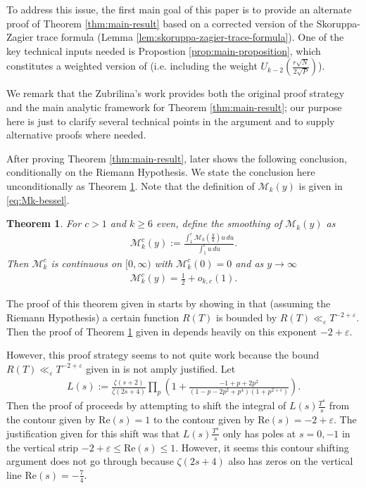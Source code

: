 \documentclass[12pt,letterpaper,reqno]{amsart}
\theoremstyle{plain}
\newtheorem{theorem}{Theorem}[section]
\theoremstyle{definition}
\numberwithin{equation}{section}
\numberwithin{figure}{section}
\numberwithin{table}{section}
\newcommand{\lrp}[1]{\!\left(#1\right)}
\newcommand{\M}{\mathcal{M}}
\begin{document}
To address this issue, the first main goal of this paper is to provide an alternate proof of Theorem \ref{thm:main-result} based on a corrected version of the Skoruppa-Zagier trace formula (Lemma \ref{lem:skoruppa-zagier-trace-formula}). One of the key technical inputs needed is Propostion \ref{prop:main-proposition}, which constitutes a weighted version of \cite[Proposition 3.2]{Zubrilina} (i.e. including the weight $U_{k-2}\lrp{\frac{r \sqrt N}{2 \sqrt P}}$). 

We remark that the Zubrilina's work \cite{Zubrilina} provides both the original proof strategy and the
main analytic framework for Theorem \ref{thm:main-result}; our purpose here is just to clarify several technical points in the argument and to supply alternative proofs where needed.



After proving Theorem \ref{thm:main-result}, \cite[Theorem 6]{Zubrilina} later shows the following conclusion, conditionally on the Riemann Hypothesis. We state the conclusion here unconditionally as Theorem \ref{thm:second-main-result}. Note that the definition of $\M_k(y)$ is given in \eqref{eq:Mk-bessel}.
\begin{theorem} \label{thm:second-main-result}
    For $c>1$ and $k\ge6$ even, define the smoothing of $\M_k(y)$ as 
    \begin{align}
        \M_k^{c}(y)
        :=
        \frac{\displaystyle\int_1^c \M_k\lrp{\frac{y}{u}}u\, du}
        {\displaystyle\int_1^c u\, d u}.
    \end{align}
    Then $\M_k^{c}$ is continuous on $[0,\infty)$ with $\M_k^{c}(0)=0$ and as $y\to\infty$
    \begin{align} \label{eqn:second-main-thm__intro-statement__error-bound}
        \M_k^{c}(y)=\frac{1}{2}+o_{k,c}(1).
    \end{align}
\end{theorem}

The proof of this theorem given in \cite{Zubrilina} starts by showing in \cite[Lemma 7.3]{Zubrilina} that (assuming the Riemann Hypothesis) a certain function $R(T)$ is bounded by $R(T) \ll_\varepsilon  T^{-2+\varepsilon}$. Then the proof of Theorem \ref{thm:second-main-result} given in \cite{Zubrilina} depends heavily on this exponent $-2+\varepsilon$.

However, this proof strategy seems to not quite work because the bound $R(T) \ll_\varepsilon  T^{-2+\varepsilon}$ given in \cite[Lemma 7.3]{Zubrilina} is not amply justified.
Let 
\begin{align}
    L(s):=\frac{\zeta(s+2)}{\zeta(2s+4)}\prod_{p}\left(1+\frac{-1+p+2p^2}{(1-p-2p^2+p^4)(1+p^{2+s})}\right).
\end{align}
Then the proof of \cite[Lemma 7.3]{Zubrilina} proceeds by attempting to shift the integral of $L(s)\frac{T^s}{s}$ from the contour given by $\mathrm{Re}(s)=1$ to the contour given by $\mathrm{Re}(s)=-2+\varepsilon$. The justification given for this shift was that $L(s)\frac{T^s}{s}$ only has poles at $s=0,-1$ in the vertical strip $-2+\varepsilon \le \mathrm{Re}(s) \le 1$. However, it seems this contour shifting argument does not go through because $\zeta(2s+4)$ also has zeros on the vertical line $\mathrm{Re}(s)=-\frac{7}{4}$.
\end{document}
